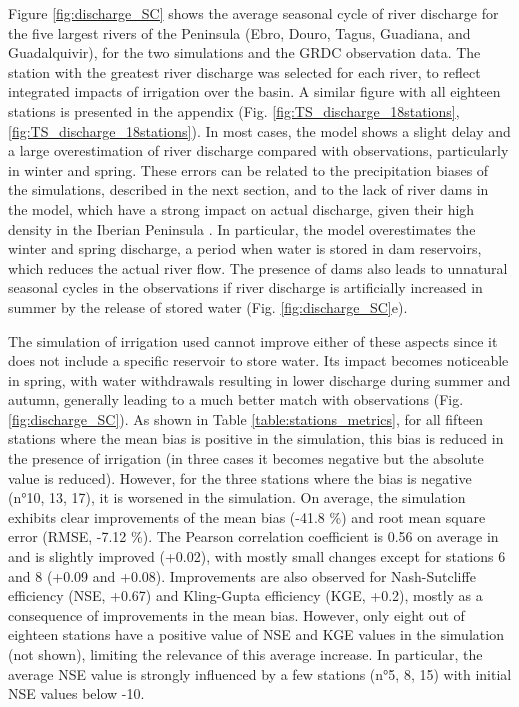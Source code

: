 Figure \ref{fig:discharge_SC} shows the average seasonal cycle of river discharge for the five largest rivers of the Peninsula (Ebro, Douro, Tagus, Guadiana, and Guadalquivir), for the two simulations and the GRDC observation data. The station with the greatest river discharge was selected for each river, to reflect integrated impacts of irrigation over the basin. A similar figure with all eighteen stations is presented in the appendix (Fig. \ref{fig:TS_discharge_18stations}, \ref{fig:TS_discharge_18stations}).
In most cases, the model shows a slight delay and a large overestimation of river discharge compared with observations, particularly in winter and spring. These errors can be related to the precipitation biases of the simulations, described in the next section, and to the lack of river dams in the model, which have a strong impact on actual discharge, given their high density in the Iberian Peninsula \citep[Fig. \ref{fig:selected_stations}, ][]{sabater_chapter_2022, moran-tejeda_reservoir_2012, lobera_geomorphic_2015}. In particular, the model overestimates the winter and spring discharge, a period when water is stored in dam reservoirs, which reduces the actual river flow.
The presence of dams also leads to unnatural seasonal cycles in the observations if river discharge is artificially increased in summer by the release of stored water (Fig. \ref{fig:discharge_SC}e).

The simulation of irrigation used cannot improve either of these aspects since it does not include a specific reservoir to store water. Its impact becomes noticeable in spring, with water withdrawals resulting in lower discharge during summer and autumn, generally leading to a much better match with observations (Fig. \ref{fig:discharge_SC}). 
As shown in Table \ref{table:stations_metrics}, for all fifteen stations where the mean bias is positive in the \noirr simulation, this bias is reduced in the presence of irrigation (in three cases it becomes negative but the absolute value is reduced). However, for the three stations where the \noirr bias is negative (n°10, 13, 17), it is worsened in the \irr simulation. On average, the \irr simulation exhibits clear improvements of the mean bias (-41.8 \%) and root mean square error (RMSE, -7.12 \%). The Pearson correlation coefficient is 0.56 on average in \noirr and is slightly improved (+0.02), with mostly small changes except for stations 6 and 8 (+0.09 and +0.08). Improvements are also observed for Nash-Sutcliffe efficiency (NSE, +0.67) and Kling-Gupta efficiency (KGE, +0.2), mostly as a consequence of improvements in the mean bias. However, only eight out of eighteen stations have a positive value of NSE and KGE values in the \noirr simulation (not shown), limiting the relevance of this average increase. In particular, the average NSE value is strongly influenced by a few stations (n°5, 8, 15) with initial NSE values below -10.

